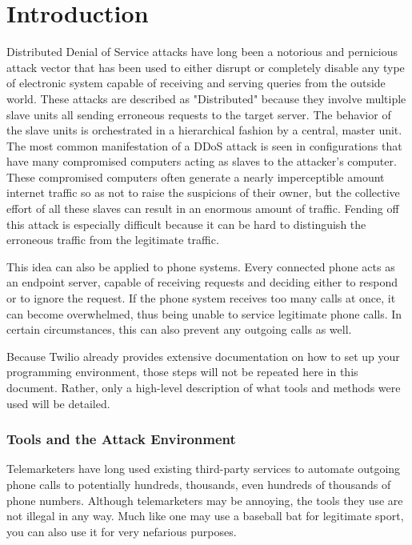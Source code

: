 \documentclass[10pt]{report}
\begin{document}
\restoregeometry

\chapter{Introduction}

Distributed Denial of Service attacks have long been a notorious and pernicious attack vector that has been used to either disrupt or completely disable any type of electronic system capable of receiving and serving queries from the outside world. These attacks are described as "Distributed" because they involve multiple slave units all sending erroneous requests to the target server. The behavior of the slave units is orchestrated in a hierarchical fashion by a central, master unit. The most common manifestation of a DDoS attack is seen in configurations that have many compromised computers acting as slaves to the attacker's computer. These compromised computers often generate a nearly imperceptible  amount internet traffic so as not to raise the suspicions of their owner, but the collective effort of all these slaves can result in an enormous amount of traffic. Fending off this attack is especially difficult because it can be hard to distinguish the erroneous traffic from the legitimate traffic.

This idea can also be applied to phone systems. Every connected phone acts as an endpoint server, capable of receiving requests and deciding either to respond or to ignore the request. If the phone system receives too many calls at once, it can become overwhelmed, thus being unable to service legitimate phone calls. In certain circumstances, this can also prevent any outgoing calls as well.

Because Twilio already provides extensive documentation on how to set up your programming environment, those steps will not be repeated here in this document. Rather, only a high-level description of what tools and methods were used will be detailed.

\subsection{Tools and the Attack Environment}

Telemarketers have long used existing third-party services to automate outgoing phone calls to potentially hundreds, thousands, even hundreds of thousands of phone numbers. Although telemarketers may be annoying, the tools they use are not illegal in any way. Much like one may use a baseball bat for legitimate sport, you can also use it for very nefarious purposes.
\end{document}
